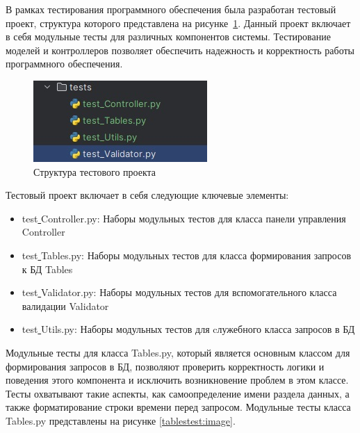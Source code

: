В рамках тестирования программного обеспечения была разработан тестовый проект, структура которого представлена на рисунке~\ref{fig:test1}. Данный проект включает в себя модульные тесты для различных компонентов системы.
Тестирование моделей и контроллеров позволяет обеспечить надежность и корректность работы программного обеспечения. 
\begin{figure}[H]
	\centering
	\includegraphics[width=0.6\linewidth]{images/test1}
	\caption{Структура тестового проекта}
	\label{fig:test1}
\end{figure}
Тестовый проект включает в себя следующие ключевые элементы:
\begin{itemize}
	\item test\underline{ }Controller.py: Наборы модульных тестов для класса панели управления Controller
	\item test\underline{ }Tables.py: Наборы модульных тестов для класса формирования запросов к БД Tables
	\item test\underline{ }Validator.py: Наборы модульных тестов для вспомогательного класса валидации Validator
	\item test\underline{ }Utils.py: Наборы модульных тестов для cлужебного класса запросов в БД
\end{itemize}
Модульные тесты для класса Tables.py, который является основным классом для формирования запросов в БД, позволяют проверить корректность
логики и поведения этого компонента и исключить возникновение проблем в этом классе. Тесты охватывают такие аспекты, как самоопределение имени раздела данных, а также форматирование строки времени перед запросом.
Модульные тесты класса Tables.py представлены на рисунке \ref{tablestest:image}.

